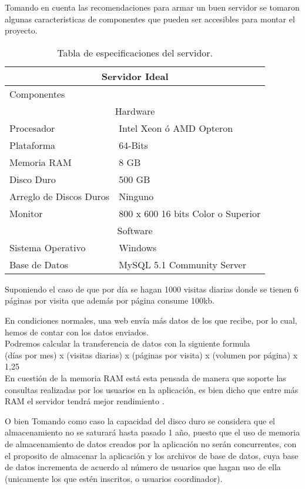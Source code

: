 	Tomando en cuenta las recomendaciones para armar un buen servidor se tomaron algunas caracteristicas de componentes que pueden ser accesibles para montar el proyecto. \cite{serv}\cite{servi}
	\begin{table}[htbp]
		\begin{center}
			\begin{tabular}{|l|l|}
				\hline
				\multicolumn{2}{|c|}{Servidor Ideal} \\
				\hline
				Componentes & \\
				\hline
				\multicolumn{2}{|c|}{Hardware} \\
				\hline
				Procesador & Intel Xeon ó AMD Opteron\\
				\hline
				Plataforma & 64-Bits\\
				\hline
				Memoria RAM & 8 GB\\
				\hline
				Disco Duro & 500 GB\\
				\hline
				Arreglo de Discos Duros & Ninguno\\
				\hline
				Monitor & 800 x 600 16 bits Color o Superior\\
				\hline
				\multicolumn{2}{|c|}{Software} \\
				\hline
				Sistema Operativo & Windows \\
				\hline
				Base de Datos & MySQL 5.1 Community Server\\
				\hline
			\end{tabular}
			\caption{Tabla de especificaciones del servidor.}
		\end{center}
	\end{table}
Suponiendo el caso de que por día se hagan 1000 visitas diarias donde se tienen 6 páginas por visita que además por página consume 100kb.

En condiciones normales, una web envía más datos de los que recibe, por lo cual, hemos de contar con los datos enviados.
\\
Podremos calcular la transferencia de datos con la siguiente formula\\

(días por mes) x (visitas diarias) x (páginas por visita) x (volumen por página) x 1,25\\

En cuestión de la memoria RAM está esta pensada de manera que soporte las consultas realizadas por los usuarios en la aplicación, es bien dicho que entre más RAM el servidor tendrá mejor rendimiento \cite{servi}.

O bien Tomando como caso la capacidad del disco duro se considera que el almacenamiento no se saturará hasta pasado 1 año, puesto que el uso de memoria de almacenamiento de datos creados por la aplicación no serán concurrentes, con el proposito de almacenar la aplicación y los archivos de base de datos, cuya base de datos incrementa de acuerdo al número de usuarios que hagan uso de ella (unicamente los que estén inscritos, o usuarios coordinador).\\


